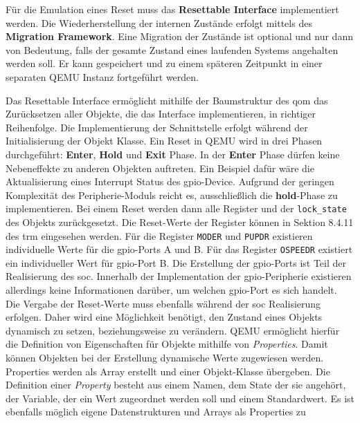 Für die Emulation eines Reset muss das \textbf{Resettable
Interface}\cite{QemuDocsResetInterface} implementiert werden.
Die Wiederherstellung der internen Zustände erfolgt mittels des
\textbf{Migration Framework}\cite{QemuDocsMigrationFramework}.
Eine Migration der Zustände ist optional und nur dann von Bedeutung, falls
der gesamte Zustand eines laufenden Systems angehalten werden soll.
Er kann gespeichert und zu einem späteren Zeitpunkt in einer separaten QEMU
Instanz fortgeführt werden.

Das Resettable Interface ermöglicht mithilfe der Baumstruktur des \ac{qom} das
Zurücksetzen aller Objekte, die das Interface implementieren, in richtiger
Reihenfolge.
Die Implementierung der Schnittstelle erfolgt während der Initialisierung der
Objekt Klasse.
\newline
Ein Reset in QEMU wird in drei Phasen durchgeführt:
\textbf{Enter}, \textbf{Hold} und \textbf{Exit} Phase.
\newline
In der \textbf{Enter} Phase dürfen keine Nebeneffekte zu anderen Objekten
auftreten.
Ein Beispiel dafür wäre die Aktualisierung eines Interrupt Status des
\ac{gpio}-Device.
Aufgrund der geringen Komplexität des Peripherie-Moduls reicht es,
ausschließlich die \textbf{hold}-Phase zu implementieren.
Bei einem Reset werden dann alle Register und der \texttt{lock\_state} des
Objekts zurückgesetzt. 
Die Reset-Werte der Register können in Sektion 8.4.11 des \ac{trm} eingesehen
werden\cite{Stm32F4Trm}.
Für die Register \texttt{MODER} und \texttt{PUPDR} existieren individuelle
Werte für die \ac{gpio}-Ports A und B.
Für das Register \texttt{OSPEEDR} existiert ein individueller Wert für
\ac{gpio}-Port B.
Die Erstellung der \ac{gpio}-Ports ist Teil der Realisierung des \ac{soc}.
Innerhalb der Implementation der \ac{gpio}-Peripherie existieren allerdings
keine Informationen darüber, um welchen \ac{gpio}-Port es sich handelt.
Die Vergabe der Reset-Werte muss ebenfalls während der \ac{soc} Realisierung
erfolgen.
Daher wird eine Möglichkeit benötigt, den Zustand eines Objekts dynamisch zu
setzen, beziehungsweise zu verändern.
\newline
QEMU ermöglicht hierfür die Definition von Eigenschaften für Objekte mithilfe
von \textit{Properties}.
Damit können Objekten bei der Erstellung dynamische Werte zugewiesen werden.
Properties werden als Array erstellt und einer Objekt-Klasse übergeben.
Die Definition einer \textit{Property} besteht aus einem Namen, dem State der
sie angehört, der Variable, der ein Wert zugeordnet werden soll und einem
Standardwert.
Es ist ebenfalls möglich eigene Datenstrukturen und Arrays als Properties zu
